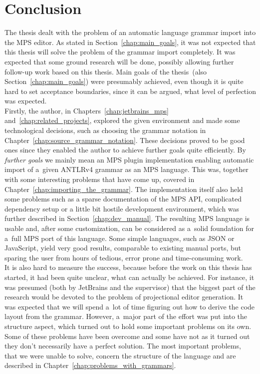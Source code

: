 \chapter{Conclusion}

The thesis dealt with the problem of an automatic language grammar import into the MPS editor.
As stated in Section~\ref{chap:main_goals}, it was not expected that this thesis will solve the problem of the grammar import completely.
It was expected that some ground research will be done, possibly allowing further follow-up work based on this thesis.
Main goals of the thesis~(also Section~\ref{chap:main_goals}) were presumably achieved, even though it is quite hard to set acceptance boundaries, since it can be argued, what level of perfection was expected.
\\

Firstly, the author, in Chapters~\ref{chap:jetbrains_mps} and~\ref{chap:related_projects}, explored the given environment and made some technological decisions, such as choosing the grammar notation in Chapter~\ref{chap:source_grammar_notation}.
These decisions proved to be good ones since they enabled the author to achieve further goals quite efficiently.
By \textit{further goals} we mainly mean an MPS plugin implementation enabling automatic import of a~given ANTLRv4 grammar as an MPS language. This was, together with some interesting problems that have come up, covered in Chapter~\ref{chap:importing_the_grammar}.
The implementation itself also held some problems such as a sparse documentation of the MPS API, complicated dependency setup or a little bit hostile development environment, which was further described in Section~\ref{chap:dev_manual}.
The resulting MPS language is usable and, after some customization, can be considered as a~solid foundation for a~full MPS port of this language.
Some simple languages, such as JSON or JavaScript, yield very good results, comparable to existing manual ports, but sparing the user from hours of tedious, error prone and time-consuming work.
\\

It is also hard to measure the success, because before the work on this thesis has started, it had been quite unclear, what can actually be achieved.
For instance, it was presumed (both by JetBrains and the supervisor) that the biggest part of the research would be devoted to the problem of projectional editor generation.
It was expected that we will spend a~lot of time figuring out how to derive the code layout from the grammar.
However, a~major part of the effort was put into the structure aspect, which turned out to hold some important problems on its own.
Some of these problems have been overcome and some have not as it turned out they don't necessarily have a perfect solution.
The most important problems, that we were unable to solve, concern the structure of the language and are described in Chapter~\ref{chap:problems_with_grammars}.
\\

